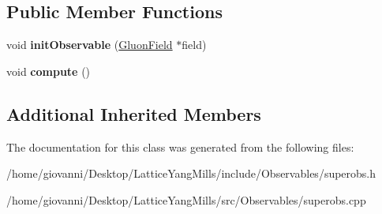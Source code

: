 \subsection*{Public Member Functions}
\begin{DoxyCompactItemize}
\item 
void {\bfseries init\+Observable} (\hyperlink{classField}{Gluon\+Field} $\ast$field)\hypertarget{classSuperObs_a292660868f04e6afc8c1300ec6fca5cc}{}\label{classSuperObs_a292660868f04e6afc8c1300ec6fca5cc}

\item 
void {\bfseries compute} ()\hypertarget{classSuperObs_a84e5e240fca5bdab31046fa87805456d}{}\label{classSuperObs_a84e5e240fca5bdab31046fa87805456d}

\end{DoxyCompactItemize}
\subsection*{Additional Inherited Members}


The documentation for this class was generated from the following files\+:\begin{DoxyCompactItemize}
\item 
/home/giovanni/\+Desktop/\+Lattice\+Yang\+Mills/include/\+Observables/superobs.\+h\item 
/home/giovanni/\+Desktop/\+Lattice\+Yang\+Mills/src/\+Observables/superobs.\+cpp\end{DoxyCompactItemize}
